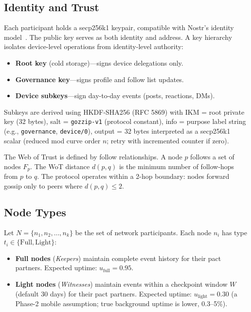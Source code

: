 \documentclass[11pt,a4paper]{article}
\begin{document}
\subsection{Identity and Trust}

Each participant holds a secp256k1 keypair, compatible with Nostr's identity model~\cite{nostr}. The public key serves as both identity and address. A key hierarchy isolates device-level operations from identity-level authority:

\begin{itemize}
  \item \textbf{Root key} (cold storage)---signs device delegations only.
  \item \textbf{Governance key}---signs profile and follow list updates.
  \item \textbf{Device subkeys}---sign day-to-day events (posts, reactions, DMs).
\end{itemize}

Subkeys are derived using HKDF-SHA256 (RFC 5869) with IKM = root private key (32 bytes), salt = \texttt{gozzip-v1} (protocol constant), info = purpose label string (e.g., \texttt{governance}, \texttt{device/0}), output = 32 bytes interpreted as a secp256k1 scalar (reduced mod curve order $n$; retry with incremented counter if zero).

The Web of Trust is defined by follow relationships. A node $p$ follows a set of nodes $F_p$. The WoT distance $d(p,q)$ is the minimum number of follow-hops from $p$ to $q$. The protocol operates within a 2-hop boundary: nodes forward gossip only to peers where $d(p,q) \leq 2$.

\subsection{Node Types}

Let $N = \{n_1, n_2, \ldots, n_k\}$ be the set of network participants. Each node $n_i$ has type $t_i \in \{\text{Full}, \text{Light}\}$:

\begin{itemize}
  \item \textbf{Full nodes} (\emph{Keepers}) maintain complete event history for their pact partners. Expected uptime: $u_{\text{full}} = 0.95$.
  \item \textbf{Light nodes} (\emph{Witnesses}) maintain events within a checkpoint window $W$ (default 30 days) for their pact partners. Expected uptime: $u_{\text{light}} = 0.30$ (a Phase-2 mobile assumption; true background uptime is lower, 0.3--5\%).
\end{itemize}
\end{document}
